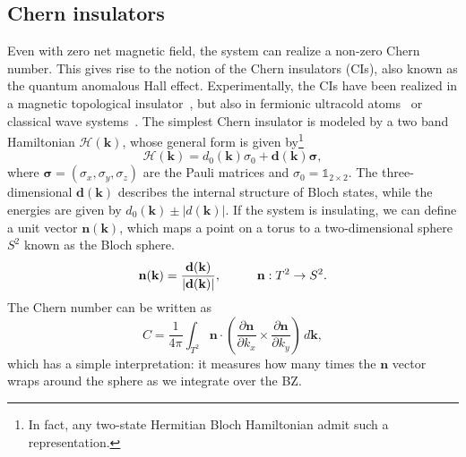 \subsection{Chern insulators}
\label{sec:ci}
Even with zero net magnetic field, the system can realize a non-zero Chern number. This gives rise to the notion of the Chern insulators (CIs), also known as the quantum anomalous Hall effect. Experimentally, the CIs have been realized in a magnetic topological insulator~\cite{Chang167}, but also in fermionic ultracold atoms~\cite{Jotzu2014} or classical wave systems~\cite{CIacustic2019}. The simplest Chern insulator is modeled by a two band Hamiltonian $\mathcal{H}( \mathbf{k} )$, whose general form is given by\footnote{In fact, any two-state Hermitian Bloch Hamiltonian admit such a representation.}
\begin{equation}
\mathcal{H}( \mathbf{k} ) =  d_0 (\mathbf{k}) \sigma_0 + \mathbf{d}( \mathbf{k} )  \boldsymbol{\sigma},
\label{eq:twoband}
\end{equation}
where $ \boldsymbol{\sigma} = (\sigma_x, \sigma_y, \sigma_z)$ are the Pauli matrices and $  \sigma_0 = \mathbb{1}_{2 \times 2}$. The three-dimensional $\mathbf{d}( \mathbf{k} )$ describes the internal structure of Bloch states, while the energies are given by $d_0(\mathbf{k}) \pm |d(\mathbf{k})|$. If the system is insulating, we can define a unit vector $\mathbf{n} ( \mathbf{k})$, which maps a point on a torus to a two-dimensional sphere $S^2$ known as the Bloch sphere.
\begin{equation}
\mathbf{n} (\mathbf{k} ) = \frac{\mathbf{d}( \mathbf{k} ) }{|\mathbf{d} (\mathbf{k})|}, \hspace*{1cm} \mathbf{n} : T^2 \rightarrow S^2.
\end{equation} 
The Chern number can be written as
\begin{equation}
C = \frac{1}{4 \pi} \int_{T^2} \mathbf{n} \cdot \left( \frac{\partial \mathbf{n} }{\partial k_x} \times \frac{\partial \mathbf{n} }{ \partial k_y} \right) \, d \mathbf{k},
\end{equation}
which has a simple interpretation: it measures how many times the $\mathbf{n}$ vector wraps around the sphere as we integrate over the BZ.

